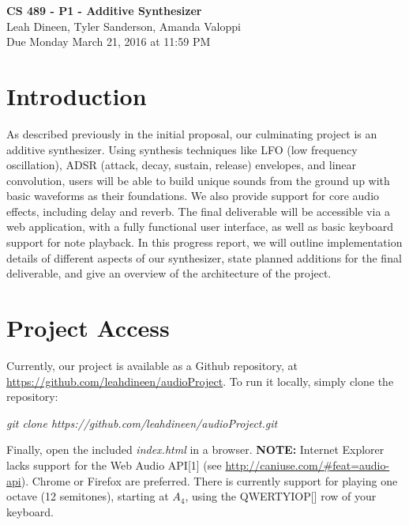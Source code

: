 \documentclass[a4paper, 12pt]{article}
\begin{document}
\noindent
\begin{center}
\LARGE\textbf{CS 489 - P1 - Additive Synthesizer}\\
\large{Leah Dineen, Tyler Sanderson, Amanda Valoppi} \\
\large{Due Monday March 21, 2016 at 11:59 PM}


\end{center}

\section*{Introduction}
As described previously in the initial proposal, our culminating project is an additive synthesizer. Using synthesis techniques like LFO (low frequency oscillation), ADSR (attack, decay, sustain, release) envelopes, and linear convolution, users will be able to build unique sounds from the ground up with basic waveforms as their foundations. We also provide support for core audio effects, including delay and reverb. The final deliverable will be accessible via a web application, with a fully functional user interface, as well as basic keyboard support for note playback. In this progress report, we will outline implementation details of different aspects of our synthesizer, state planned additions for the final deliverable, and give an overview of the architecture of the project.

\section*{Project Access}
Currently, our project is available as a Github repository, at \url{https://github.com/leahdineen/audioProject}. To run it locally, simply clone the repository:
\begin{center}\emph{git clone https://github.com/leahdineen/audioProject.git}\end{center}

Finally, open the included \emph{index.html} in a browser. \textbf{NOTE: } Internet Explorer lacks support for the Web Audio API[1] (see \url{http://caniuse.com/#feat=audio-api}). Chrome or Firefox are preferred. There is currently support for playing one octave (12 semitones), starting at $A_4$, using the QWERTYIOP[] row of your keyboard.
\end{document}
